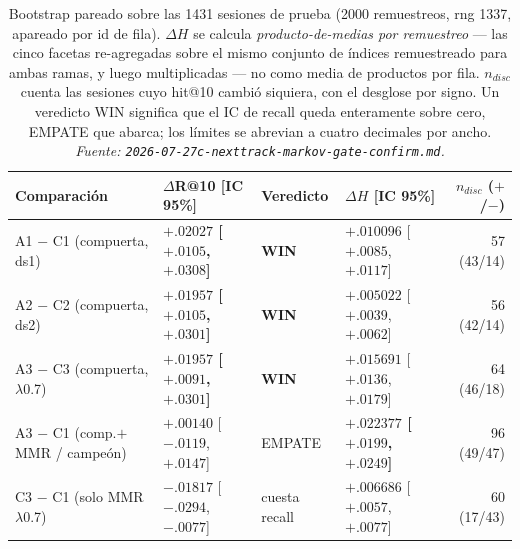 \documentclass[11pt]{article}
\newcommand{\best}[1]{\textbf{#1}}
\begin{document}
\begin{table}[ht]
  \centering
  \caption{Bootstrap pareado sobre las \num{1431} sesiones de prueba (\num{2000}
  remuestreos, rng \num{1337}, apareado por id de fila). $\Delta H$ se calcula
  \emph{producto-de-medias por remuestreo} --- las cinco facetas re-agregadas sobre
  el mismo conjunto de índices remuestreado para ambas ramas, y luego multiplicadas
  --- no como media de productos por fila. $n_{disc}$ cuenta las sesiones cuyo
  hit@10 cambió siquiera, con el desglose por signo. Un veredicto WIN significa que
  el IC de recall queda enteramente sobre cero, EMPATE que abarca; los límites se
  abrevian a cuatro decimales por ancho.
  \emph{Fuente: \texttt{2026-07-27c-nexttrack-markov-gate-confirm.md}.}}
  \label{tab:nexttrack-markovgate-paired}
  {\scriptsize\setlength{\tabcolsep}{4pt}\begin{tabular}{llllr}
    \toprule
    Comparación & $\Delta$R@10 [IC 95\%] & Veredicto & $\Delta H$ [IC 95\%] & $n_{disc}$ ($+$/$-$) \\
    \midrule
    A1 $-$ C1 (compuerta, ds1) & \best{$+.02027$ [$+.0105$, $+.0308$]} & \best{WIN} & $+.010096$ [$+.0085$, $+.0117$] & 57 (43/14) \\
    A2 $-$ C2 (compuerta, ds2) & \best{$+.01957$ [$+.0105$, $+.0301$]} & \best{WIN} & $+.005022$ [$+.0039$, $+.0062$] & 56 (42/14) \\
    A3 $-$ C3 (compuerta, $\lambda$0.7) & \best{$+.01957$ [$+.0091$, $+.0301$]} & \best{WIN} & $+.015691$ [$+.0136$, $+.0179$] & 64 (46/18) \\
    A3 $-$ C1 (comp.$+$MMR / campeón) & $+.00140$ [$-.0119$, $+.0147$] & EMPATE & \best{$+.022377$ [$+.0199$, $+.0249$]} & 96 (49/47) \\
    C3 $-$ C1 (solo MMR $\lambda$0.7) & $-.01817$ [$-.0294$, $-.0077$] & cuesta recall & $+.006686$ [$+.0057$, $+.0077$] & 60 (17/43) \\
    \bottomrule
  \end{tabular}}
\end{table}
\end{document}
